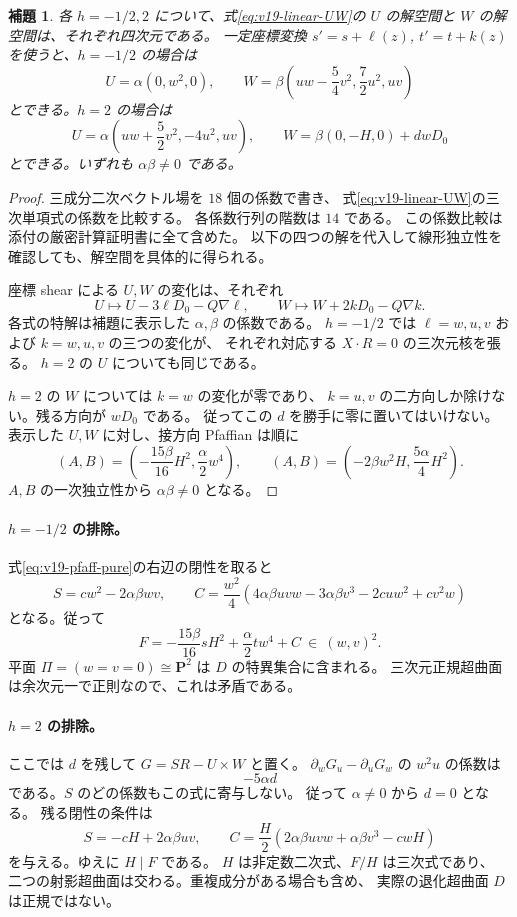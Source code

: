 \documentclass[11pt,a4paper]{ltjsarticle}
\newtheorem{lemma}[theorem]{補題}
\theoremstyle{remark}\newtheorem{remark}[theorem]{注意}
\begin{document}
\begin{lemma}\label{lem:v19-linear-spaces}
各 $h=-1/2,2$ について、式\eqref{eq:v19-linear-UW}の $U$ の解空間と
$W$ の解空間は、それぞれ四次元である。
一定座標変換
$s'=s+\ell(z)$, $t'=t+k(z)$ を使うと、$h=-1/2$ の場合は
\[
 U=\alpha(0,w^2,0),\qquad
 W=\beta\left(uw-\frac54v^2,\frac72u^2,uv\right)
\]
とできる。$h=2$ の場合は
\[
 U=\alpha\left(uw+\frac52v^2,-4u^2,uv\right),\qquad
 W=\beta(0,-H,0)+d wD_0
\]
とできる。いずれも $\alpha\beta\ne0$ である。
\end{lemma}

\begin{proof}
三成分二次ベクトル場を $18$ 個の係数で書き、
式\eqref{eq:v19-linear-UW}の三次単項式の係数を比較する。
各係数行列の階数は $14$ である。
この係数比較は添付の厳密計算証明書に全て含めた。
以下の四つの解を代入して線形独立性を確認しても、解空間を具体的に得られる。

座標 shear による $U,W$ の変化は、それぞれ
\[
 U\longmapsto U-3\ell D_0-Q\nabla\ell,
 \qquad W\longmapsto W+2kD_0-Q\nabla k.
\]
各式の特解は補題に表示した $\alpha,\beta$ の係数である。
$h=-1/2$ では $\ell=w,u,v$ および $k=w,u,v$ の三つの変化が、
それぞれ対応する $X\cdot R=0$ の三次元核を張る。
$h=2$ の $U$ についても同じである。

$h=2$ の $W$ については $k=w$ の変化が零であり、
$k=u,v$ の二方向しか除けない。残る方向が $wD_0$ である。
従ってこの $d$ を勝手に零に置いてはいけない。
表示した $U,W$ に対し、接方向 Pfaffian は順に
\[
 (A,B)=\left(-\frac{15\beta}{16}H^2,\frac\alpha2w^4\right),
 \qquad
 (A,B)=\left(-2\beta w^2H,\frac{5\alpha}{4}H^2\right).
\]
$A,B$ の一次独立性から $\alpha\beta\ne0$ となる。
\end{proof}

\paragraph{$h=-1/2$ の排除。}
式\eqref{eq:v19-pfaff-pure}の右辺の閉性を取ると
\[
 S=cw^2-2\alpha\beta wv,
\qquad
 C=\frac{w^2}{4}
 \left(4\alpha\beta uvw-3\alpha\beta v^3-2cu w^2+cv^2w\right)
\]
となる。従って
\[
 F=-\frac{15\beta}{16}sH^2+\frac\alpha2tw^4+C
       \ \in\ (w,v)^2.
\]
平面 $\Pi=(w=v=0)\cong\mathbf P^2$ は $D$ の特異集合に含まれる。
三次元正規超曲面は余次元一で正則なので、これは矛盾である。

\paragraph{$h=2$ の排除。}
ここでは $d$ を残して
$G=S R-U\times W$ と置く。
$\partial_wG_u-\partial_uG_w$ の $w^2u$ の係数は
\[
                         -5\alpha d
\]
である。$S$ のどの係数もこの式に寄与しない。
従って $\alpha\ne0$ から $d=0$ となる。
残る閉性の条件は
\[
 S=-cH+2\alpha\beta uv,\qquad
 C=\frac{H}{2}
       \left(2\alpha\beta uvw+\alpha\beta v^3-cwH\right)
\]
を与える。ゆえに $H\mid F$ である。
$H$ は非定数二次式、$F/H$ は三次式であり、
二つの射影超曲面は交わる。重複成分がある場合も含め、
実際の退化超曲面 $D$ は正規ではない。
\end{document}
